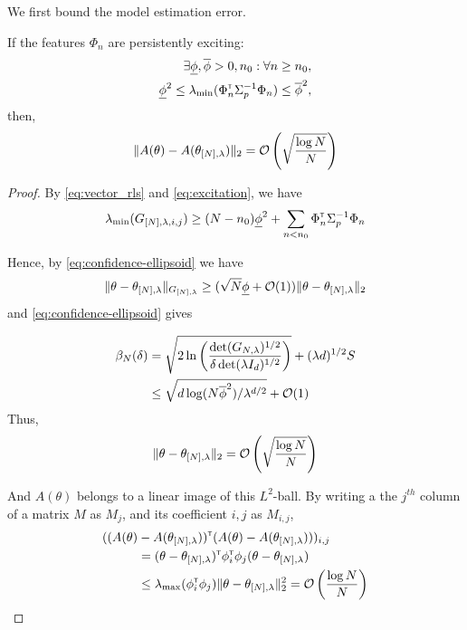 \documentclass{article}
\begin{document}
We first bound the model estimation error.
\begin{lemma}
If the features $\Phi_n$ are persistently exciting:
\begin{align}
\label{eq:excitation}
\exists \underline{\phi},\overline{\phi}>0, n_0: \forall n\geq n_0,\nonumber\\ \underline{\phi}^2 \leq \lambda_{\min}(\Phi_{n}^{\mathsf{\scriptscriptstyle T}}\Sigma_{p}^{-1}\Phi_{n}) \leq \overline{\phi}^2,
\end{align}
then,
\[\|A(\theta) - A(\theta_{[N],\lambda})\|_2 = \mathcal{O}\left( \sqrt{\frac{\log N}{N}} \right) \]
\end{lemma}
\begin{proof}
By \eqref{eq:vector_rls} and \eqref{eq:excitation}, we have $$\lambda_{\min}(G_{[N],\lambda,i,j}) \geq (N-n_0)\underline{\phi}^2 + \sum_{n<n_0}\Phi_{n}^{\mathsf{\scriptscriptstyle T}}\Sigma_{p}^{-1}\Phi_{n}$$

Hence, by \eqref{eq:confidence-ellipsoid} we have 
\begin{align*}
	\|\theta - \theta_{[N],\lambda}\|_{G_{[N],\lambda}} \geq (\sqrt{N}\underline{\phi} + \mathcal{O}(1))\|\theta - \theta_{[N],\lambda}\|_{2}
\end{align*}
and \eqref{eq:confidence-ellipsoid} gives

\begin{align*}
\beta_N(\delta) &= \sqrt{2\ln \left(\frac{\det(G_{N,\lambda})^{1/2}}{\delta\det(\lambda I_d)^{1/2}}\right)}
+ (\lambda d)^{1/2}S\\
&\leq \sqrt{d\log (N\overline{\phi}^2) / \lambda^{d/2}} + \mathcal{O}(1)
\end{align*}
Thus,
\[\|\theta - \theta_{[N],\lambda}\|_{2} = \mathcal{O}\left( \sqrt{\frac{\log N}{N}} \right) \]

And $A(\theta)$ belongs to a linear image of this $L^2$-ball. By writing a the $j^{th}$ column of a matrix $M$ as $M_j$, and its coefficient $i,j$ as $M_{i,j}$,
\begin{align*}
((A(\theta)&-A(\theta_{[N],\lambda}))^{\mathsf{\scriptscriptstyle T}} (A(\theta) - A(\theta_{[N],\lambda})))_{i,j}\\
&= (\theta-\theta_{[N],\lambda})^{\mathsf{\scriptscriptstyle T}}\phi_{i}^{\mathsf{\scriptscriptstyle T}}\phi_j(\theta-\theta_{[N],\lambda}) \\
&\leq \lambda_{\max}(\phi_{i}^{\mathsf{\scriptscriptstyle T}}\phi_j) \|\theta - \theta_{[N],\lambda}\|_{2}^2 = \mathcal{O}\left( {\frac{\log N}{N}} \right) 
\end{align*}

\end{proof}
\end{document}
